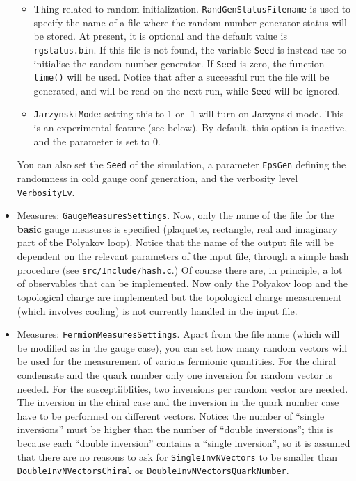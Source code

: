 \begin{itemize}
\begin{itemize}
\item Thing related to random initialization. \verb|RandGenStatusFilename| is 
used to specify the name of a file where the random number generator status 
will be stored. At present, it is optional and the default value is 
\verb|rgstatus.bin|. If this file is not found, the variable \verb|Seed| is 
instead use to initialise the random number generator. If \verb|Seed| is zero, 
the function \verb|time()| will be used. Notice that after a successful run 
the file will be generated, and will be read on the next run, while \verb|Seed| 
will be ignored.
\item \verb|JarzynskiMode|: setting this to 1 or -1 will turn on Jarzynski 
mode. This is an experimental feature (see below). By default, this option is 
inactive, and the parameter is set to 0.
\end{itemize}
You can also set the \verb|Seed| of the simulation, 
a parameter 
\verb|EpsGen| defining the randomness in cold gauge conf generation, and the 
verbosity level \verb|VerbosityLv|. 


    \item{Measures: \verb|GaugeMeasuresSettings|.} Now, only the name of the 
        file for the {\bf basic} gauge measures is specified (plaquette, 
rectangle, real and imaginary part of the Polyakov loop). 
        Notice that the name of the 
output file will be dependent on the relevant parameters of the input file, 
through a simple hash procedure (see \verb|src/Include/hash.c|.)
        Of course there are, in principle, a lot of observables that 
can be implemented. Now only the Polyakov loop and the topological charge are 
implemented but the topological charge measurement (which involves cooling) is 
not currently handled in the input file. 
    \item{Measures: \verb|FermionMeasuresSettings|.}
    Apart from the file name (which will be modified as in the gauge case),   
you can set how many random vectors will be used for the measurement of various 
fermionic quantities. For the chiral condensate and the quark number only one 
inversion for random vector is needed. For the susceptiiblities, two inversions 
per random vector are needed. The inversion in the chiral case and the inversion 
in the quark number case have to be performed on different vectors. Notice: the 
number of ``single inversions'' must be higher than the 
number of ``double inversions''; this is because each ``double inversion'' 
contains a ``single inversion'', so it is assumed that there are no reasons to 
ask for \verb|SingleInvNVectors| to be smaller than 
\verb|DoubleInvNVectorsChiral| or \verb|DoubleInvNVectorsQuarkNumber|.
    

\end{itemize}

